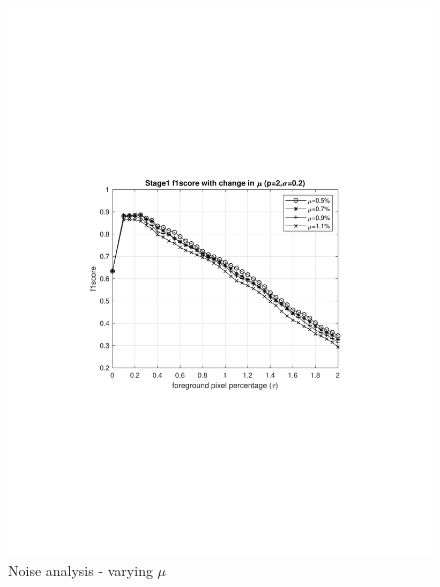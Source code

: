 \begin{figure}[ht]
    \centering
    \includegraphics[width=\linewidth,trim={100 240 100 240},clip]{images/noise-analysis-mog-mu}
    \caption{Noise analysis - varying $\mu$}
    \label{fig:noise-analysis-mog-mu}
\end{figure}